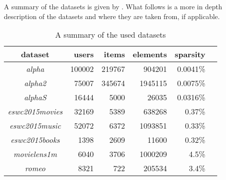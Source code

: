 A summary of the datasets is given by . What follows is a more in depth description of the datasets and where they are taken from, if applicable.

\begin{table}[h]
    \centering
    \begin{tabular}{| c | r | r | r | r | l |}
        \hline
        \textbf{dataset}        & \textbf{users}    & \textbf{items}    & \textbf{elements} & \textbf{sparsity}  \\ \hline

        \textit{alpha}          &   100002          & 219767            & 904201            & 0.0041\%           \\ \hline
        \textit{alpha2}         &   75007           & 345674            & 1945115           & 0.0075\%           \\ \hline
        \textit{alphaS}         &   16444           & 5000              & 26035             & 0.0316\%           \\ \hline
        \textit{eswc2015movies} &   32169           & 5389              & 638268            & 0.37\%             \\ \hline
        \textit{eswc2015music}  &   52072           & 6372              & 1093851           & 0.33\%             \\ \hline
        \textit{eswc2015books}  &   1398            & 2609              & 11600             & 0.32\%             \\ \hline
        \textit{movielens1m}    &   6040            & 3706              & 1000209           & 4.5\%              \\ \hline
        \textit{romeo}          &   8321            & 722               & 205534            & 3.4\%              \\ \hline

    \end{tabular}
    \caption{A summary of the used datasets}
    \label{tab:datasets}
\end{table}

\FloatBarrier

